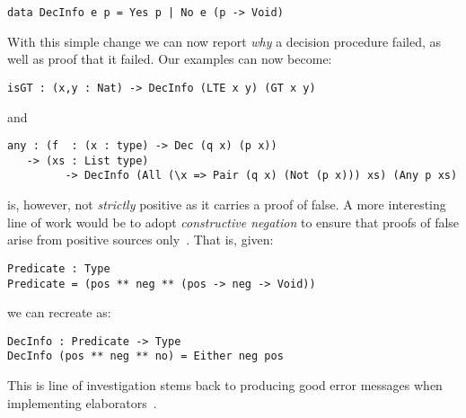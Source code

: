 \begin{verbatim}
data DecInfo e p = Yes p | No e (p -> Void)
\end{verbatim}

With this simple change we can now report \emph{why} a decision procedure failed, as well as proof that it failed.
Our examples can now become:

\begin{verbatim}
isGT : (x,y : Nat) -> DecInfo (LTE x y) (GT x y)
\end{verbatim}

\noindent
and

\begin{verbatim}
any : (f  : (x : type) -> Dec (q x) (p x))
   -> (xs : List type)
         -> DecInfo (All (\x => Pair (q x) (Not (p x))) xs) (Any p xs)
\end{verbatim}



 is, however, not \emph{strictly} positive as it carries a proof of false.
A more interesting line of work would be to adopt \emph{constructive negation} to ensure that proofs of false arise from positive sources only~\cite{msfp/Atkey22}.
That is, given:

\begin{verbatim}
Predicate : Type
Predicate = (pos ** neg ** (pos -> neg -> Void))
\end{verbatim}

we can recreate  as:

\begin{verbatim}
DecInfo : Predicate -> Type
DecInfo (pos ** neg ** no) = Either neg pos
\end{verbatim}

This is line of investigation stems back to
producing good error messages when implementing
elaborators~\cite{DBLP:journals/jfp/McBrideM04}.


